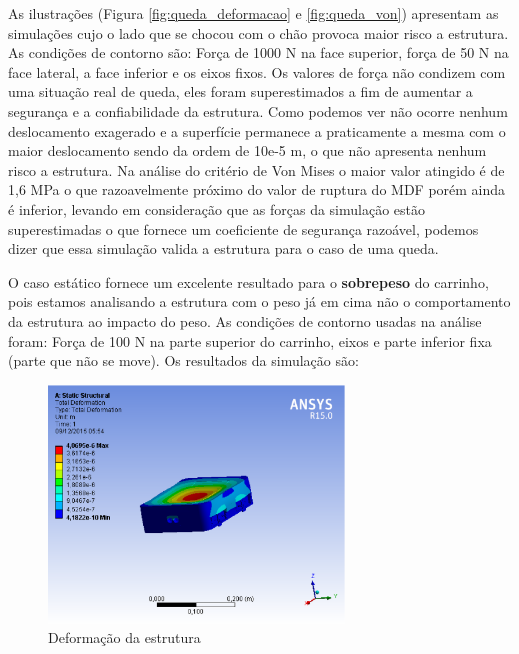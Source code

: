 As ilustrações (Figura \ref{fig:queda_deformacao} e \ref{fig:queda_von}) apresentam as simulações cujo o lado que se chocou com o chão provoca
maior risco a estrutura. As condições de contorno são: Força de 1000 N na face superior, força de 50 N na face lateral, a face inferior e os
eixos fixos. Os valores de força não condizem com uma situação real de queda, eles foram superestimados a fim de aumentar a segurança e a
confiabilidade da estrutura. Como podemos ver não ocorre nenhum deslocamento exagerado e a superfície permanece a praticamente a mesma com
o maior deslocamento sendo da ordem de 10e-5 m, o que não apresenta nenhum risco a estrutura. Na análise do critério de Von Mises o maior
valor atingido é de 1,6 MPa o que razoavelmente próximo do valor de ruptura do MDF porém ainda é inferior, levando em consideração que as
forças da simulação estão superestimadas o que fornece um coeficiente de segurança razoável, podemos dizer que essa simulação valida a
estrutura para o caso de uma queda.

O caso estático fornece um excelente resultado para o \textbf{sobrepeso} do carrinho, pois estamos analisando a estrutura com o peso já
em cima não o comportamento da estrutura ao impacto do peso. As condições de contorno usadas na análise foram: Força de 100 N na parte
superior do carrinho, eixos e parte inferior fixa (parte que não se move). Os resultados da simulação são:

\begin{figure}[H]
    \centering
    \includegraphics[width=0.7\textwidth]{figuras/sobrepeso_deformacao.eps}
    \caption{Deformação da estrutura}
    \label{fig:sobrepeso_deformacao}
\end{figure}

